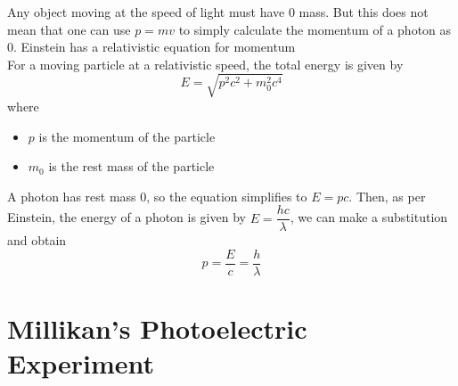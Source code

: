 \documentclass[a4paper,12pt]{article}
\let\oldsection\section
\renewcommand\section{\clearpage\oldsection}
\newcommand{\lb}{\\[8pt]}
\begin{document}
Any object moving at the speed of light must have 0 mass. But this does not mean that one can use $p = mv$ to simply calculate the momentum of a photon as 0. Einstein has a relativistic equation for momentum\lb
For a moving particle at a relativistic speed, the total energy is given by
$$E = \sqrt{p^2c^2 + m_0^2c^4}$$
where
\begin{itemize}
  \item $p$ is the momentum of the particle
  \item $m_0$ is the rest mass of the particle
\end{itemize}
A photon has rest mass 0, so the equation simplifies to $E = pc$. Then, as per Einstein, the energy of a photon is given by $E = \dfrac{hc}{\lambda}$, we can make a substitution and obtain
\begin{equation}\label{eq:photonmomentum}
  p = \frac{E}{c} = \frac{h}{\lambda}
\end{equation}

\section{Millikan's Photoelectric Experiment}
\end{document}
